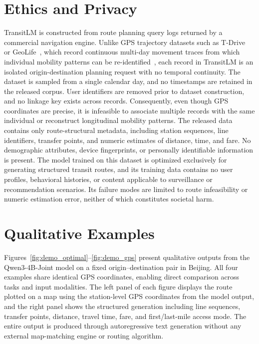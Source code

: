 \documentclass{llmxive}
\begin{document}
\section{Ethics and Privacy}
\label{app:ethics}

TransitLM is constructed from route planning query logs returned by a commercial navigation engine. Unlike GPS trajectory datasets such as T-Drive~\cite{yuan2010tdrive} or GeoLife~\cite{zheng2010geolife}, which record continuous multi-day movement traces from which individual mobility patterns can be re-identified~\cite{de2013unique}, each record in TransitLM is an isolated origin-destination planning request with no temporal continuity. The dataset is sampled from a single calendar day, and no timestamps are retained in the released corpus. User identifiers are removed prior to dataset construction, and no linkage key exists across records. Consequently, even though GPS coordinates are precise, it is infeasible to associate multiple records with the same individual or reconstruct longitudinal mobility patterns. The released data contains only route-structural metadata, including station sequences, line identifiers, transfer points, and numeric estimates of distance, time, and fare. No demographic attributes, device fingerprints, or personally identifiable information is present. The model trained on this dataset is optimized exclusively for generating structured transit routes, and its training data contains no user profiles, behavioral histories, or content applicable to surveillance or recommendation scenarios. Its failure modes are limited to route infeasibility or numeric estimation error, neither of which constitutes societal harm.

\section{Qualitative Examples}
\label{app:case_study}

Figures~\ref{fig:demo_optimal}--\ref{fig:demo_gps} present qualitative outputs from the Qwen3-4B-Joint model on a fixed origin--destination pair in Beijing. All four examples share identical GPS coordinates, enabling direct comparison across tasks and input modalities. The left panel of each figure displays the route plotted on a map using the station-level GPS coordinates from the model output, and the right panel shows the structured generation including line sequences, transfer points, distance, travel time, fare, and first/last-mile access mode. The entire output is produced through autoregressive text generation without any external map-matching engine or routing algorithm.
\end{document}

